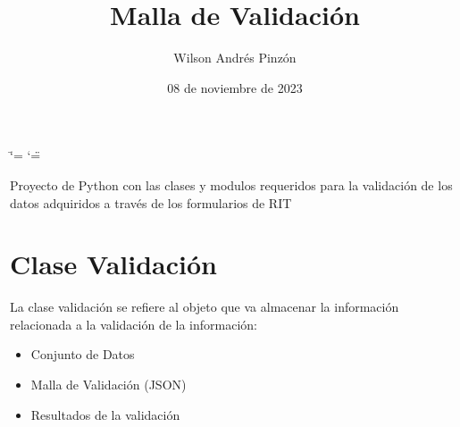\documentclass[letterpaper,10pt,spanish]{sphinxmanual}
\title{Malla de Validación}
\date{08 de noviembre de 2023}
\author{Wilson Andrés Pinzón}
\begin{document}
\ifdefined\shorthandoff
  \ifnum\catcode`\=\string=\active\shorthandoff{=}\fi
  \ifnum\catcode`\"=\active{}\fi
\fi

\pagestyle{empty}
\sphinxmaketitle
\pagestyle{plain}
\sphinxtableofcontents
\pagestyle{normal}
\label{\detokenize{index::doc}}


\sphinxAtStartPar
Proyecto de Python con las clases y modulos requeridos para la validación de los datos adquiridos a través de los formularios de RIT


\chapter{Clase Validación}
\label{\detokenize{index:clase-validacion}}
\sphinxAtStartPar
La clase validación se refiere al objeto que va almacenar la información relacionada a la validación de la información:
\begin{itemize}
\item {} 
\sphinxAtStartPar
Conjunto de Datos

\item {} 
\sphinxAtStartPar
Malla de Validación (JSON)

\item {} 
\sphinxAtStartPar
Resultados de la validación

\end{itemize}
\end{document}
